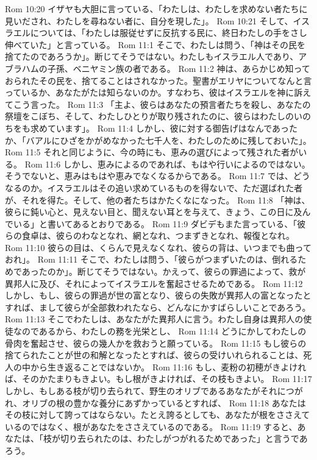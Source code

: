 Rom 10:20  イザヤも大胆に言っている、「わたしは、わたしを求めない者たちに見いだされ、わたしを尋ねない者に、自分を現した」。
Rom 10:21  そして、イスラエルについては、「わたしは服従せずに反抗する民に、終日わたしの手をさし伸べていた」と言っている。
Rom 11:1  そこで、わたしは問う、「神はその民を捨てたのであろうか」。断じてそうではない。わたしもイスラエル人であり、アブラハムの子孫、ベニヤミン族の者である。
Rom 11:2  神は、あらかじめ知っておられたその民を、捨てることはされなかった。聖書がエリヤについてなんと言っているか、あなたがたは知らないのか。すなわち、彼はイスラエルを神に訴えてこう言った。
Rom 11:3  「主よ、彼らはあなたの預言者たちを殺し、あなたの祭壇をこぼち、そして、わたしひとりが取り残されたのに、彼らはわたしのいのちをも求めています」。
Rom 11:4  しかし、彼に対する御告げはなんであったか、「バアルにひざをかがめなかった七千人を、わたしのために残しておいた」。
Rom 11:5  それと同じように、今の時にも、恵みの選びによって残された者がいる。
Rom 11:6  しかし、恵みによるのであれば、もはや行いによるのではない。そうでないと、恵みはもはや恵みでなくなるからである。
Rom 11:7  では、どうなるのか。イスラエルはその追い求めているものを得ないで、ただ選ばれた者が、それを得た。そして、他の者たちはかたくなになった。
Rom 11:8  「神は、彼らに鈍い心と、見えない目と、聞えない耳とを与えて、きょう、この日に及んでいる」と書いてあるとおりである。
Rom 11:9  ダビデもまた言っている、「彼らの食卓は、彼らのわなとなれ、網となれ、つまずきとなれ、報復となれ。
Rom 11:10  彼らの目は、くらんで見えなくなれ、彼らの背は、いつまでも曲っておれ」。
Rom 11:11  そこで、わたしは問う、「彼らがつまずいたのは、倒れるためであったのか」。断じてそうではない。かえって、彼らの罪過によって、救が異邦人に及び、それによってイスラエルを奮起させるためである。
Rom 11:12  しかし、もし、彼らの罪過が世の富となり、彼らの失敗が異邦人の富となったとすれば、まして彼らが全部救われたなら、どんなにかすばらしいことであろう。
Rom 11:13  そこでわたしは、あなたがた異邦人に言う。わたし自身は異邦人の使徒なのであるから、わたしの務を光栄とし、
Rom 11:14  どうにかしてわたしの骨肉を奮起させ、彼らの幾人かを救おうと願っている。
Rom 11:15  もし彼らの捨てられたことが世の和解となったとすれば、彼らの受けいれられることは、死人の中から生き返ることではないか。
Rom 11:16  もし、麦粉の初穂がきよければ、そのかたまりもきよい。もし根がきよければ、その枝もきよい。
Rom 11:17  しかし、もしある枝が切り去られて、野生のオリブであるあなたがそれにつがれ、オリブの根の豊かな養分にあずかっているとすれば、
Rom 11:18  あなたはその枝に対して誇ってはならない。たとえ誇るとしても、あなたが根をささえているのではなく、根があなたをささえているのである。
Rom 11:19  すると、あなたは、「枝が切り去られたのは、わたしがつがれるためであった」と言うであろう。
